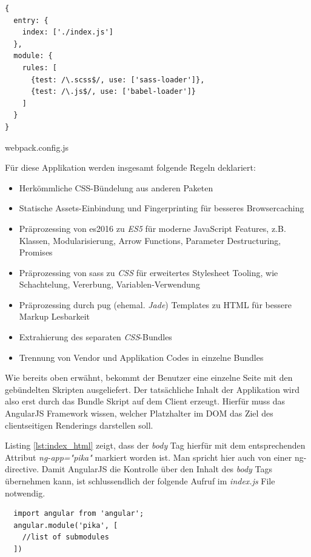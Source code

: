 \begin{listing}[H]
\begin{verbatim}
{
  entry: {
    index: ['./index.js']
  },
  module: {
    rules: [
      {test: /\.scss$/, use: ['sass-loader']},
      {test: /\.js$/, use: ['babel-loader']}
    ]
  }
}
\end{verbatim}
\caption{webpack.config.js}
\label{lst:webpack_config}
\end{listing}

Für diese Applikation werden insgesamt folgende Regeln deklariert:

\begin{itemize}
 \item Herkömmliche CSS-Bündelung aus anderen Paketen
 \item Statische Assets-Einbindung und Fingerprinting für besseres Browsercaching
 \item Präprozessing von \gls{es2016} zu \textit{ES5} für moderne JavaScript Features, z.B. Klassen, Modularisierung, Arrow Functions, Parameter Destructuring, Promises
 \item Präprozessing von \gls{sass} zu \textit{CSS} für erweitertes Stylesheet Tooling, wie Schachtelung, Vererbung, Variablen-Verwendung
 \item Präprozessing durch \gls{pug} (ehemal. \textit{Jade}) Templates zu HTML für bessere Markup Lesbarkeit
 \item Extrahierung des separaten \textit{CSS}-Bundles
 \item Trennung von Vendor und Applikation Codes in einzelne Bundles
\end{itemize}

Wie bereits oben erwähnt, bekommt der Benutzer eine einzelne Seite mit den gebündelten Skripten ausgeliefert. Der tatsächliche Inhalt der Applikation wird also erst durch das Bundle Skript auf dem Client erzeugt. Hierfür muss das AngularJS Framework wissen, welcher Platzhalter im DOM das Ziel des clientseitigen Renderings darstellen soll.

Listing \ref{lst:index_html} zeigt, dass der \textit{body} Tag hierfür mit dem entsprechenden Attribut \textit{ng-app="pika"} markiert worden ist. Man spricht hier auch von einer \gls{ng-directive}. Damit AngularJS die Kontrolle über den Inhalt des \textit{body} Tags übernehmen kann, ist schlussendlich der folgende Aufruf im \textit{index.js} File notwendig.

\begin{listing}[H]
\begin{verbatim}
  import angular from 'angular';
  angular.module('pika', [
    //list of submodules
  ])
\end{verbatim}
\end{listing}

